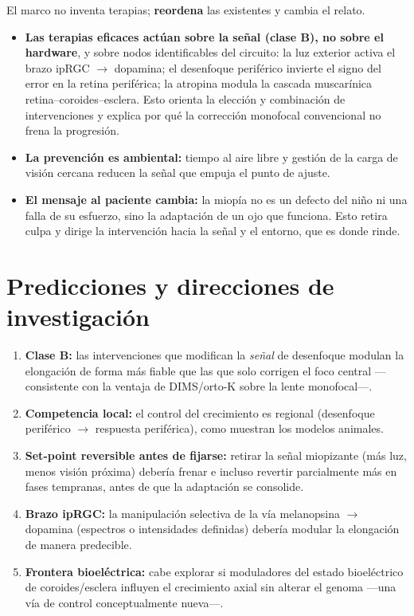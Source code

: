\documentclass[11pt,a4paper]{article}
\begin{document}
El marco no inventa terapias; \textbf{reordena} las existentes y cambia el relato.

\begin{itemize}[leftmargin=1.4em]
  \item \textbf{Las terapias eficaces actúan sobre la señal (clase B), no sobre el hardware}, y sobre nodos identificables del circuito: la luz exterior activa el brazo ipRGC $\rightarrow$ dopamina; el desenfoque periférico invierte el signo del error en la retina periférica; la atropina modula la cascada muscarínica retina--coroides--esclera. Esto orienta la elección y combinación de intervenciones y explica por qué la corrección monofocal convencional no frena la progresión.
  \item \textbf{La prevención es ambiental:} tiempo al aire libre y gestión de la carga de visión cercana reducen la señal que empuja el punto de ajuste.
  \item \textbf{El mensaje al paciente cambia:} la miopía no es un defecto del niño ni una falla de su esfuerzo, sino la adaptación de un ojo que funciona. Esto retira culpa y dirige la intervención hacia la señal y el entorno, que es donde rinde.
\end{itemize}

\section{Predicciones y direcciones de investigación}

\begin{enumerate}[leftmargin=1.6em]
  \item \textbf{Clase B:} las intervenciones que modifican la \emph{señal} de desenfoque modulan la elongación de forma más fiable que las que solo corrigen el foco central ---consistente con la ventaja de DIMS/orto-K sobre la lente monofocal---.
  \item \textbf{Competencia local:} el control del crecimiento es regional (desenfoque periférico $\rightarrow$ respuesta periférica), como muestran los modelos animales.
  \item \textbf{Set-point reversible antes de fijarse:} retirar la señal miopizante (más luz, menos visión próxima) debería frenar e incluso revertir parcialmente más en fases tempranas, antes de que la adaptación se consolide.
  \item \textbf{Brazo ipRGC:} la manipulación selectiva de la vía melanopsina $\rightarrow$ dopamina (espectros o intensidades definidas) debería modular la elongación de manera predecible.
  \item \textbf{Frontera bioeléctrica:} cabe explorar si moduladores del estado bioeléctrico de coroides/esclera influyen el crecimiento axial sin alterar el genoma ---una vía de control conceptualmente nueva---.
\end{enumerate}
\end{document}
